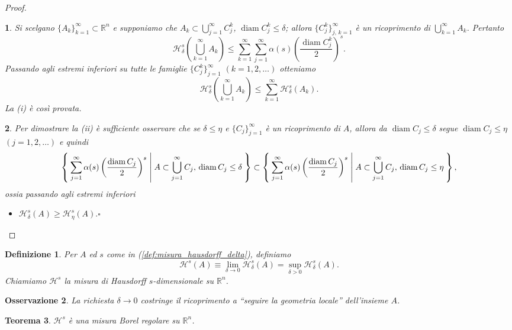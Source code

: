 \documentclass[a4paper,10pt,openright,oneside]{book}
\theoremstyle{theoremstyle}
\newtheorem{teorema}{Teorema}[section]
\theoremstyle{theoremstylewoheader}
\theoremstyle{theoremstyle}
\newtheorem{definizione}[teorema]{Definizione}
\newtheorem{osservazione}[teorema]{Osservazione}
\theoremstyle{proofsecstyle}
\newtheorem{proofsec}{}
\theoremstyle{nonumberplain}
\newtheorem{proof}{Dim.}
\newcommand{\RR}{\ensuremath{\mathbb{R}}}
\newcommand{\Haus}{\ensuremath{\mathcal{H}}}
\DeclareMathOperator{\diam}{diam}
\renewcommand{\qedsymbol}{\ensuremath{\square}}
\newcommand{\mymath}[2]{\begin{itemize}%
  \item[]\hfill\hbox{}\ensuremath{\displaystyle #1}\hfill\ensuremath{\displaystyle #2}%
  \end{itemize}}
\begin{document}
\begin{proof}
\begin{proofsec}
Si scelgano $\{A_k\}_{k=1}^\infty \subset \RR^n$ e supponiamo che $A_k \subset \bigcup_{j=1}^\infty C_j^k$, $\diam C_j^k \le \delta$; allora $\{C_j^k\}_{j,\,k=1}^\infty$ è un ricoprimento di $\bigcup_{k=1}^\infty A_k$. Pertanto
\[
\Haus_\delta^s \left(\bigcup_{k=1}^\infty A_k\right) \le \sum_{k=1}^\infty \sum_{j=1}^\infty \alpha(s) \left(\frac{\diam C_j^k}{2}\right)^s.
\]
Passando agli estremi inferiori su tutte le famiglie $\{C_j^k\}_{j=1}^\infty$ $(k = 1, 2, \ldots)$ otteniamo
\[
\Haus_\delta^s \left(\bigcup_{k=1}^\infty A_k\right) \le \sum_{k=1}^\infty \Haus_\delta^s(A_k).
\]
La (i) è così provata.
\end{proofsec}

\begin{proofsec}
Per dimostrare la (ii) è sufficiente osservare che se $\delta \le \eta$ e $\{C_j\}_{j=1}^\infty$ è un ricoprimento di $A$, allora da $\diam C_j \le \delta$ segue $\diam C_j \le \eta$ $(j = 1, 2, \ldots)$ e quindi
\[
\Set{ \sum_{j=1}^\infty \alpha(s) \left(\frac{\diam C_j}{2}\right)^s | A \subset \bigcup_{j=1}^\infty C_j,\, \diam C_j \le \delta } \subset \Set{ \sum_{j=1}^\infty \alpha(s) \left(\frac{\diam C_j}{2}\right)^s | A \subset \bigcup_{j=1}^\infty C_j,\, \diam C_j \le \eta },
\]
ossia passando agli estremi inferiori
\mymath{\Haus_\delta^s(A) \ge \Haus_\eta^s(A).}{\qedsymbol}
\end{proofsec}
\end{proof}

\begin{definizione}
\label{def:misura_hausdorff}
Per $A$ ed $s$ come in (\ref{def:misura_hausdorff_delta}), definiamo
\[
\Haus^s(A) \equiv \lim_{\delta \to 0} \Haus_\delta^s(A) = \sup_{\delta > 0} \Haus_\delta^s (A).
\]
Chiamiamo $\Haus^s$ la \emph{misura di Hausdorff $s$-dimensionale} su $\RR^n$.
\end{definizione}

\begin{osservazione}
La richiesta $\delta \to 0$ costringe il ricoprimento a ``seguire la geometria locale'' dell'insieme $A$.
\end{osservazione}

\begin{teorema}
\label{thm:misura_hausdorff}
$\Haus^s$ è una misura Borel regolare su $\RR^n$.
\end{teorema}
\end{document}
